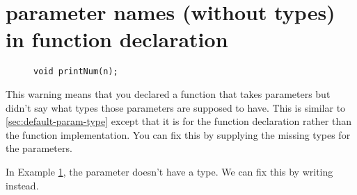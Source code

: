\section{parameter names (without types) in function declaration}\label{sec:typeless-params}

\begin{figure}[htb]
\begin{lstlisting}
void printNum(n);
\end{lstlisting}
\label{ex:typeless-params}
\end{figure}

This warning means that you declared a function that takes parameters but didn't say what types those parameters are supposed to have.
This is similar to \ref{sec:default-param-type} except that it is for the function declaration rather than the function implementation.
You can fix this by supplying the missing types for the parameters.

In Example \ref{ex:typeless-params}, the parameter  doesn't have a type.
We can fix this by writing  instead.
\newpage